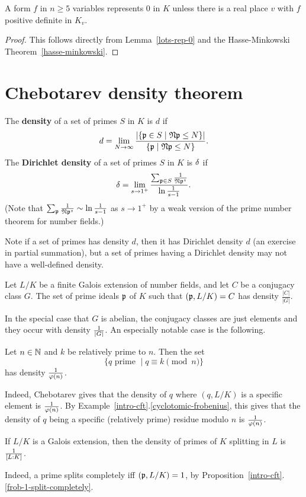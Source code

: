\begin{cor}
A form $f$ in $n\ge 5$ variables represents 0 in $K$ unless there is a real place $v$ with $f$ positive definite in $K_v$.
\end{cor}
\begin{proof}
This follows directly from Lemma~\ref{lots-rep-0} and the Hasse-Minkowski Theorem~\ref{hasse-minkowski}.
\end{proof}
\section{Chebotarev density theorem}
\begin{df}
The \textbf{density} of a set of primes $S$ in $K$ is $d$ if 
\[
d=\lim_{N\to \infty} \frac{|\{\mathfrak{p} \in S\mid \mathfrak{N}\mathfrak{p}\le N\}|}{\{\mathfrak{p}\mid \mathfrak{N}\mathfrak{p}\le N\}}.
\]
The \textbf{Dirichlet density} of a set of primes $S$ in $K$ is $\delta$ if 
\[
\delta=\lim_{s\to 1^+}\frac{\sum_{\mathfrak{p}\in S}\frac{1}{\mathfrak{N} \mathfrak{p}^s}}{\ln \frac{1}{s-1}}.
\]
(Note that $\sum_{\mathfrak{p}}\frac{1}{\mathfrak{N}\mathfrak{p}^s}\sim \ln \frac{1}{s-1}$ as $s\to 1^+$ by a weak version of the prime number theorem for number fields.)
\end{df}
Note if a set of primes has density $d$, then it has Dirichlet density $d$ (an exercise in partial summation), but a set of primes having a Dirichlet density may not have a well-defined density.
\begin{thm}
Let $L/K$ be a finite Galois extension of number fields, and let $C$ be a conjugacy class $G$. The set of prime ideals $\mathfrak{p}$ of $K$ such that $(\mathfrak{p},L/K)=C$ has density $\frac{|C|}{|G|}$.
\end{thm}
In the special case that $G$ is abelian, the conjugacy classes are just elements and they occur with density $\frac{1}{|G|}$. An especially notable case is the following.
\begin{ex}[Dirichlet]
Let $n\in \mathbb{N}$ and $k$ be relatively prime to $n$. Then the set
\[
\{q \text{ prime }\mid q\equiv k\pmod n\}
\]
has density $\frac{1}{\varphi(n)}$.

Indeed, Chebotarev gives that the density of $q$ where $(q,L/K)$ is a specific element is $\frac{1}{\varphi(n)}$.
By Example~\ref{intro-cft}.\ref{cyclotomic-frobenius}, this gives that the density of $q$ being a specific (relatively prime) residue modulo $n$ is $\frac{1}{\varphi(n)}$.
\end{ex}
\begin{ex}
If $L/K$ is a Galois extension, then the density of primes of $K$ splitting in $L$ is $\frac{1}{[L:K]}$.

Indeed, a prime splits completely iff $(\mathfrak{p},L/K)=1$, by Proposition~\ref{intro-cft}.\ref{frob-1-split-completely}.
\end{ex}

